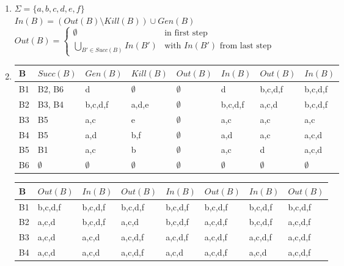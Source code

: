 \documentclass[12pt,fleqn]{article}		%
\begin{document}
\begin{enumerate}
{}
\item $ \Sigma=\{a,b,c,d,e,f\} $\\
$ In(B) = (Out(B) \setminus Kill(B)) \cup Gen(B)$\\
$ Out(B) = 
\begin{cases}
\emptyset & \text{in first step}\\
\bigcup_{B' \in Succ(B)} In(B') & \text{with } In(B') \text{ from last step}
\end{cases}
$
\item
\begin{tabularx}{\textwidth}{| l | X | X | X || X | X || X | X ||}
\hline
B & $Succ(B) $ & $Gen(B)$ & $Kill(B)$ & $Out(B)$ & $In(B)$ & $Out(B)$ & $In(B)$\\
\hline
B1 & B2, B6 & d & $\emptyset$ & $\emptyset$ & d & b,c,d,f & b,c,d,f \\
\hline
B2 & B3, B4 & b,c,d,f & a,d,e & $\emptyset$ & b,c,d,f & a,c,d & b,c,d,f \\
\hline
B3 & B5 & a,c & e & $\emptyset$ & a,c & a,c & a,c \\
\hline
B4 & B5 & a,d & b,f & $\emptyset$ & a,d & a,c & a,c,d \\
\hline
B5 & B1 & a,c & b & $\emptyset$ & a,c & d & a,c,d\\
\hline
B6 & $\emptyset$ & $\emptyset$ & $\emptyset$ & $\emptyset$ & $\emptyset$ & $\emptyset$ & $\emptyset$ \\
\hline
\end{tabularx}
\begin{tabularx}{\textwidth}{| l || X | X || X | X || X | X || X |}
\hline
B & $Out(B)$ & $In(B)$ & $Out(B)$ & $In(B)$ & $Out(B)$ & $In(B)$ & $Out(B)$\\
\hline
B1 & b,c,d,f & b,c,d,f & b,c,d,f & b,c,d,f & b,c,d,f & b,c,d,f & b,c,d,f\\
\hline
B2 & a,c,d & b,c,d,f & a,c,d & b,c,d,f & a,c,d,f & b,c,d,f & a,c,d,f\\
\hline
B3 & a,c,d & a,c,d & a,c,d,f & a,c,d,f & a,c,d,f & a,c,d,f & a,c,d,f\\
\hline
B4 & a,c,d & a,c,d & a,c,d,f & a,c,d & a,c,d,f & a,c,d & a,c,d,f\\

\end{tabularx}
\end{enumerate}
\end{document}
